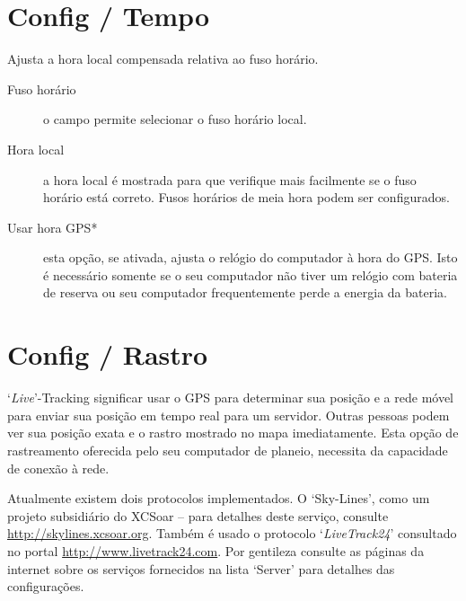 \section{Config / Tempo}

Ajusta a hora local compensada relativa ao fuso horário.

\begin{description}
\item[Fuso horário]  o campo permite selecionar o fuso horário local.
\item[Hora local]  a hora local é mostrada para que verifique mais facilmente se o fuso horário está correto.  Fusos horários de meia hora podem ser configurados.
\item[Usar hora GPS*] esta opção, se ativada, ajusta o relógio do computador à hora do GPS.  Isto é necessário somente se o seu computador não tiver um relógio com bateria de reserva ou seu computador frequentemente perde a energia da bateria.
\end{description}


\section{Config / Rastro}

`{\it Live}'-Tracking significar usar o GPS para determinar sua posição e a rede móvel para enviar sua posição em tempo real para um servidor.  Outras pessoas podem ver sua posição exata e o rastro mostrado no mapa imediatamente.  Esta opção de rastreamento oferecida pelo seu computador de planeio, necessita da capacidade de conexão à rede.  

Atualmente existem dois protocolos implementados. O ‘Sky-Lines’, como um projeto subsidiário do XCSoar – para detalhes deste serviço, consulte
\url{http://skylines.xcsoar.org}. 
Também é usado o protocolo  `{\em LiveTrack24}' consultado no portal  \url{http://www.livetrack24.com}.  
Por gentileza consulte as páginas da internet sobre os serviços fornecidos na lista ‘Server’ para detalhes das configurações.

